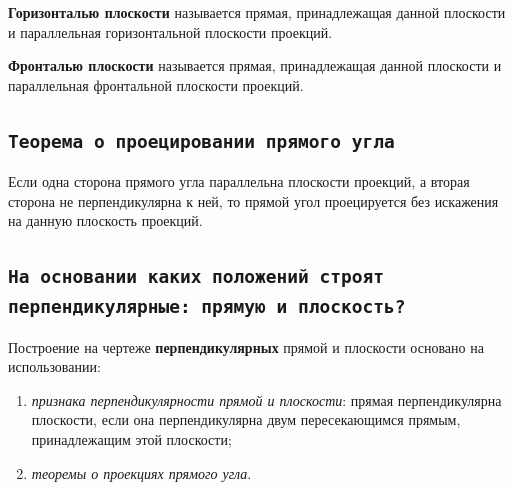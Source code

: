 \begin{myquote}
    
\end{myquote}

{\bf Горизонталью плоскости} называется прямая, принадлежащая данной плоскости и параллельная горизонтальной плоскости проекций.


{\bf Фронталью плоскости} называется прямая, принадлежащая данной плоскости и параллельная фронтальной плоскости проекций.



\newpage
\subsection{\texttt{Теорема о проецировании прямого угла}}

\begin{myquote}
\end{myquote}

Если одна сторона прямого угла параллельна плоскости проекций, а вторая сторона не перпендикулярна к ней, то прямой угол проецируется без искажения на данную плоскость проекций.



\newpage
\subsection{\texttt{На основании каких положений строят перпендикулярные: прямую и плоскость?}}

\begin{myquote}
    
\end{myquote}

Построение на чертеже {\bf перпендикулярных} прямой и плоскости основано на использовании:

\begin{enumerate}
    \item \textit {признака перпендикулярности прямой и плоскости}: прямая перпендикулярна плоскости, если она перпендикулярна двум пересекающимся прямым, принадлежащим этой плоскости;
    \item \textit {теоремы о проекциях прямого угла}.
\end{enumerate}


